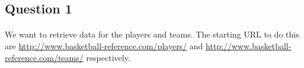 
\subsection{Question 1}
\label{subsec:311}

\paragraph{} We want to retrieve data for the players and teams. The starting URL to do this are \url{http://www.basketball-reference.com/players/} and \url{http://www.basketball-reference.com/teams/} respectively.